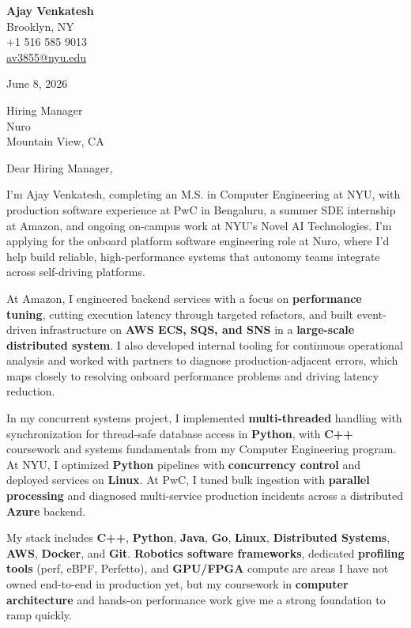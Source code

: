\documentclass[letterpaper,11pt]{article}
\begin{document}
\begin{flushleft}
\textbf{\large Ajay Venkatesh} \\
Brooklyn, NY \\
+1 516 585 9013 \\
\href{mailto:av3855@nyu.edu}{av3855@nyu.edu}
\end{flushleft}
\vspace{10pt}
June 8, 2026
\vspace{6pt}

Hiring Manager \\
Nuro \\
Mountain View, CA

\vspace{10pt}

Dear Hiring Manager,

I'm Ajay Venkatesh, completing an M.S. in Computer Engineering at NYU, with production software experience at PwC in Bengaluru, a summer SDE internship at Amazon, and ongoing on-campus work at NYU's Novel AI Technologies. I'm applying for the onboard platform software engineering role at Nuro, where I'd help build reliable, high-performance systems that autonomy teams integrate across self-driving platforms.

At Amazon, I engineered backend services with a focus on \textbf{performance tuning}, cutting execution latency through targeted refactors, and built event-driven infrastructure on \textbf{AWS ECS, SQS, and SNS} in a \textbf{large-scale distributed system}. I also developed internal tooling for continuous operational analysis and worked with partners to diagnose production-adjacent errors, which maps closely to resolving onboard performance problems and driving latency reduction.

In my concurrent systems project, I implemented \textbf{multi-threaded} handling with synchronization for thread-safe database access in \textbf{Python}, with \textbf{C++} coursework and systems fundamentals from my Computer Engineering program. At NYU, I optimized \textbf{Python} pipelines with \textbf{concurrency control} and deployed services on \textbf{Linux}. At PwC, I tuned bulk ingestion with \textbf{parallel processing} and diagnosed multi-service production incidents across a distributed \textbf{Azure} backend.

My stack includes \textbf{C++}, \textbf{Python}, \textbf{Java}, \textbf{Go}, \textbf{Linux}, \textbf{Distributed Systems}, \textbf{AWS}, \textbf{Docker}, and \textbf{Git}. \textbf{Robotics software frameworks}, dedicated \textbf{profiling tools} (perf, eBPF, Perfetto), and \textbf{GPU/FPGA} compute are areas I have not owned end-to-end in production yet, but my coursework in \textbf{computer architecture} and hands-on performance work give me a strong foundation to ramp quickly.
\end{document}
